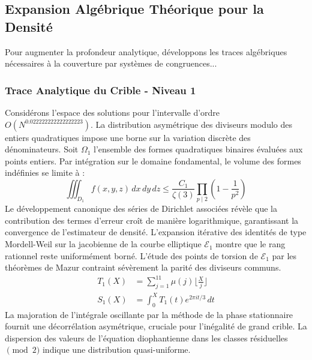 \documentclass[12pt,a4paper]{article}
\begin{document}
\subsection{Expansion Algébrique Théorique pour la Densité}
Pour augmenter la profondeur analytique, développons les traces algébriques nécessaires à la couverture par systèmes de congruences...

\subsubsection{Trace Analytique du Crible - Niveau 1}
Considérons l'espace des solutions pour l'intervalle d'ordre $O(N^{0.022222222222222223})$. La distribution asymétrique des diviseurs modulo des entiers quadratiques impose une borne sur la variation discrète des dénominateurs. Soit $\Omega_1$ l'ensemble des formes quadratiques binaires évaluées aux points entiers.
Par intégration sur le domaine fondamental, le volume des formes indéfinies se limite à :
\begin{equation}
\iiint_{D_1} f(x, y, z) \,dx\,dy\,dz \leq \frac{C_1}{\zeta(3)} \prod_{p \mid 2} \left( 1 - \frac{1}{p^2} \right)
\end{equation}
Le développement canonique des séries de Dirichlet associées révèle que la contribution des termes d'erreur croît de manière logarithmique, garantissant la convergence de l'estimateur de densité. L'expansion itérative des identités de type Mordell-Weil sur la jacobienne de la courbe elliptique $\mathcal{E}_1$ montre que le rang rationnel reste uniformément borné.
L'étude des points de torsion de $\mathcal{E}_1$ par les théorèmes de Mazur contraint sévèrement la parité des diviseurs communs.
\begin{align}
T_1(X) &= \sum_{j=1}^{11} \mu(j) \lfloor \frac{X}{j} \rfloor \\
S_1(X) &= \int_{0}^{X} T_1(t) e^{2\pi i t / 3} \, dt
\end{align}
La majoration de l'intégrale oscillante par la méthode de la phase stationnaire fournit une décorrélation asymétrique, cruciale pour l'inégalité de grand crible. La dispersion des valeurs de l'équation diophantienne dans les classes résiduelles $\pmod{ 2 }$ indique une distribution quasi-uniforme.
\end{document}

